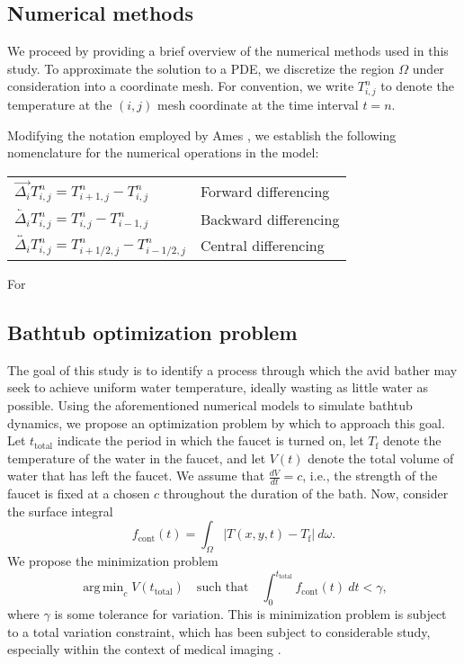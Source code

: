 \documentclass[12pt]{article}
\newcommand{\la}{\overleftarrow}
\newcommand{\ra}{\overrightarrow}
\newcommand{\ca}{\overleftrightarrow}
\newcommand{\abs}[1]{\left|#1\right|}
\DeclareMathOperator*{\argmin}{\mathrm{arg\,min}}
\begin{document}
\subsection{Numerical methods}

We proceed by providing a brief overview of the numerical methods used in
this study. To approximate the solution to a PDE, we discretize the region
$\Omega$ under consideration into a coordinate mesh. For convention, we
write $T_{i,j}^{n}$ to denote the temperature at the $(i,j)$ mesh coordinate
at the time interval $t=n$. 

Modifying the notation employed by Ames \cite{ames}, we establish the
following nomenclature for the numerical operations in the model:

\begin{center}
    \begin{tabular}[]{ll}
        $\ra{\Delta_i} T_{i,j}^n = T_{i+1,j}^n - T_{i,j}^n$ & Forward
        differencing \\
        $\la{\Delta_i} T_{i,j}^n = T_{i,j}^n - T_{i-1,j}^n$ & Backward differencing \\
        $\ca{\Delta_i} T_{i,j}^n = T_{i+1/2,j}^n - T_{i-1/2,j}^n$ & Central differencing
    \end{tabular}
\end{center}

For 

\subsection{Bathtub optimization problem}

The goal of this study is to identify a process through which the avid bather
may seek to achieve uniform water temperature, ideally wasting as little water
as possible. Using the aforementioned numerical models to simulate bathtub
dynamics, we propose an optimization problem by which to approach this goal. Let
$t_{\mathrm{total}}$ indicate the period in which the faucet is turned on, let
$T_{\mathrm{f}}$ denote the temperature of the water in the faucet, and let
$V(t)$ denote the total volume of water that has left the faucet. We assume that
$\frac{dV}{dt} = c$, i.e., the strength of the faucet is fixed at a chosen $c$ throughout the
duration of the bath. Now, consider the surface integral
\begin{equation}
    f_{\mathrm{cont}}(t) = \int_{\Omega} \abs{T(x,y,t) - T_{\mathrm{f}}} \ d\omega.
    \label{eq:\theequation}
\end{equation}
We propose the minimization problem
\begin{equation}
    \argmin_{c} V(t_{\mathrm{total}}) \quad \text{such that} \quad \int_{0}^{t_{\mathrm{total}}}
    f_{\mathrm{cont}}(t) \ dt < \gamma,
    \label{eq:\theequation}
\end{equation}
where $\gamma$ is some tolerance for variation. This is minimization
problem is subject to a total variation constraint, which has been subject to
considerable study, especially within the context of medical imaging
\cite{Zhang2005}.
\end{document}
